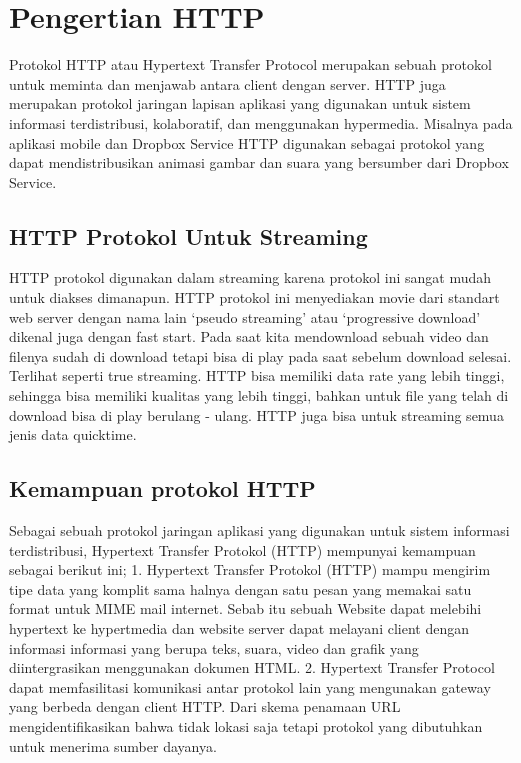 
\section{Pengertian HTTP}
Protokol HTTP atau Hypertext Transfer Protocol merupakan sebuah protokol untuk meminta dan menjawab antara client dengan server. HTTP juga merupakan protokol jaringan lapisan aplikasi yang digunakan untuk sistem informasi terdistribusi, kolaboratif, dan menggunakan hypermedia. Misalnya pada aplikasi mobile dan Dropbox Service HTTP digunakan  sebagai protokol yang dapat mendistribusikan animasi gambar dan suara yang bersumber dari Dropbox Service\cite{herdiansyah2013pembangunan}.

\subsection{HTTP Protokol Untuk Streaming}
HTTP protokol digunakan dalam streaming karena protokol ini sangat mudah untuk diakses dimanapun. HTTP protokol ini menyediakan movie dari standart web server dengan nama lain `pseudo streaming' atau `progressive download' dikenal juga dengan fast start. Pada saat kita mendownload sebuah video dan filenya sudah di download tetapi bisa di play pada saat sebelum download selesai. Terlihat seperti true streaming. HTTP bisa memiliki data rate yang lebih tinggi, sehingga bisa memiliki kualitas yang lebih tinggi, bahkan untuk file yang telah di download bisa di play berulang - ulang. HTTP juga bisa untuk streaming semua jenis data quicktime\cite{putra2010analisis}.

\subsection{Kemampuan protokol HTTP}
Sebagai sebuah protokol jaringan aplikasi yang digunakan untuk sistem informasi terdistribusi, Hypertext Transfer Protokol (HTTP) mempunyai kemampuan sebagai berikut ini;
1. Hypertext Transfer Protokol (HTTP) mampu mengirim tipe data yang komplit sama halnya dengan satu pesan yang memakai satu format untuk MIME mail internet. Sebab itu sebuah Website dapat melebihi hypertext ke hypertmedia dan website server dapat melayani client dengan informasi informasi yang berupa teks, suara, video dan grafik yang diintergrasikan menggunakan dokumen HTML.
2. Hypertext Transfer Protocol dapat memfasilitasi komunikasi antar protokol lain yang mengunakan gateway yang berbeda dengan client HTTP. Dari skema penamaan URL mengidentifikasikan bahwa tidak lokasi saja tetapi protokol yang dibutuhkan untuk menerima sumber dayanya\cite{lusiana2009sistem}.


